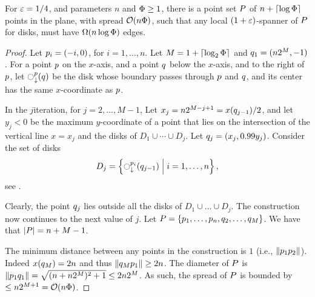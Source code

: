 \documentclass[12pt]{article}%
\begin{document}
\begin{lemma}
    For $\varepsilon =1/4$, and parameters $n$ and $\Phi \geq 1$, there is
    a point set $P$ of $n + \left\lceil {\log \Phi} \right\rceil$ points in the
    plane, with spread $\mathcal{O}( n \Phi )$, such that any local
    $(1+\varepsilon)$-spanner of $P$ for disks, must have
    $\Omega( n \log \Phi )$ edges.
\end{lemma}


\begin{proof}
    Let $p_i = (-i, 0)$, for $i=1, \ldots, n$.  Let
    $M = 1+ \left\lceil { \log_2 \Phi} \right\rceil$ and $q_1 = (n 2^M, -1)$.  For a
    point $p$ on the $x$-axis, and a point $q$ below the $x$-axis,
    and to the right of $p$, let $\diskVY{\pa}{\pb}$ be the disk
    whose boundary passes through $p$ and $q$, and its center has
    the same $x$-coordinate as $p$.

    In the $j$\th iteration, for $j=2,\ldots, M-1$, Let
    $x_j = n2^{M-j+1} = x(q_{j-1})/2$, and let $y_j < 0$ be the
    maximum $y$-coordinate of a point that lies on the intersection of
    the vertical line $x =x_j$ and the disks of
    $D_1 \cup \cdots \cup D_j$. Let $q_j = (x_j, 0.99
    y_j)$. Consider the set of disks
    \begin{equation*}
        D_j = \Set{ \diskVY{\pa_i}{\pb_{j-1}} }{i=1,\ldots, n},
    \end{equation*}
    see .

    Clearly, the point $q_j$ lies outside all the disks of
    $D_1 \cup \ldots \cup D_j$. The construction now continues to the
    next value of $j$. Let
    $P = \{ p_1, \ldots, p_n, q_2, \ldots, q_M \}$. We have
    that $|P| = n + M-1$.

    The minimum distance between any points in the construction is $1$
    (i.e., $\left\| p_1 p_2 \right\|\bigr.$). Indeed $x(q_M) = 2n$ and thus
    $\left\| q_M p_1 \right\| \geq 2n$.  The diameter of $P$ is
    $\left\| p_1 q_1 \right\| = \sqrt{(n +n2^{M})^2+ 1} \leq 2 n 2^M $. As
    such, the spread of $P$ is bounded by
    $\leq n 2^{M+1} = \mathcal{O}( n \Phi)$.


\end{proof}
\end{document}
